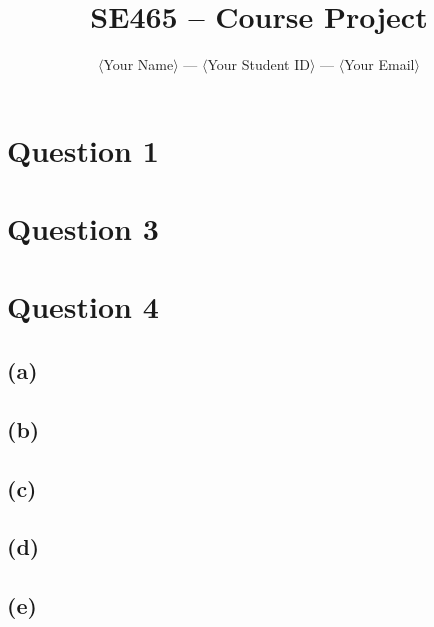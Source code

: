 \documentclass[12pt]{article}
\title{SE465 -- Course Project}
\author{$\langle$Your Name$\rangle$ --- $\langle$Your Student ID$\rangle$ --- $\langle$Your Email$\rangle$}
\date{}
\begin{document}
\maketitle

\section*{Question 1}



\section*{Question 3}


\section*{Question 4}

\subsection*{(a)}
\subsection*{(b)}
\subsection*{(c)}
\subsection*{(d)}
\subsection*{(e)}
\end{document}
